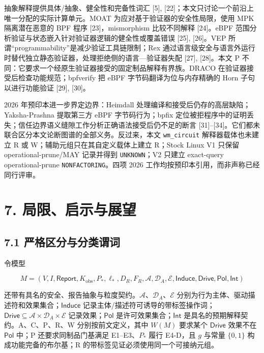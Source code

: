 \documentclass[
  11pt,
  a4paper,
]{ctexart}
\begin{document}
抽象解释提供具体/抽象、健全性和完备性词汇 {[}5{]},
{[}22{]}；本文只讨论一个前沿上唯一分配的实际计算单元。MOAT
为应对基于验证器的安全性局限，使用 MPK 隔离潜在恶意的 BPF 程序
{[}23{]}，mismorphism 比较不同解释 {[}24{]}。eBPF
范围分析验证与状态嵌入针对验证器逻辑的健全性或覆盖错误 {[}25{]},
{[}26{]}。VEP 所谓``programmability''是减少验证工具链限制；Rex
通过语言级安全与语言外运行时替代独立静态验证器，处理拒绝侧的语言---验证器失配
{[}27{]}, {[}28{]}。本文 P
不同：它要求一个经原生验证器接受的固定制品解释有界族。DRACO
在验证器接受后检查功能规范；bpfverify 把 eBPF 字节码翻译为位与内存精确的
Horn 子句以进行功能验证 {[}29{]}, {[}30{]}。

2026 年预印本进一步界定边界：Heimdall
处理编译和接受后仍存的高层缺陷；Yaksha-Prashna 提取第三方 eBPF
字节码行为；bpfix
定位被拒程序中的证明丢失；信任边界语义缝隙工作分析正确语法接受后仍不足的断言
{[}31{]}--{[}34{]}。它们都未联合区分本文论断图谱的全部义务。反过来，本文
\texttt{wm\_circuit} 解释器载体也未建立 R 或
W；辅助元组只在其自定义载体上建立 R；Stock Linux V1 只保留
operational-prune/MAY 记录并得到 \texttt{UNKNOWN}；V2 只建立 exact-query
operational-prune \texttt{NONFACTORING}。四项 2026
工作均按预印本引用，而非声称已经同行评审。

\hypertarget{7-ux5c40ux9650ux542fux793aux4e0eux5c55ux671b}{%
\section{7.
局限、启示与展望}\label{7-ux5c40ux9650ux542fux793aux4e0eux5c55ux671b}}

\hypertarget{71-ux4e25ux683cux533aux5206ux4e0eux5206ux7c7bux8c13ux8bcd}{%
\subsection{7.1
严格区分与分类谓词}\label{71-ux4e25ux683cux533aux5206ux4e0eux5206ux7c7bux8c13ux8bcd}}

令模型

\[M=(V,I,\mathsf{Report},K_{\mathrm{obs}},P_*,\ell_*,D_R,F_R,
\mathcal A,\mathcal D_A,\mathcal E,\mathsf{Induce},\mathsf{Drive},
\mathsf{Pol},\mathsf{Int})\]

还带有具名的安全、报告抽象与粒度契约。\(\mathcal A\)、\(\mathcal D_A\)、\(\mathcal E\)
分别为行为主体、驱动描述符和效果集合；\(\mathsf{Induce}\)
记录主体/描述符可诱导的带标签操作词；\(\mathsf{Drive}\subseteq\mathcal A\times\mathcal D_A\times\mathcal E\)
记录效果；\(\mathsf{Pol}\) 是许可效果集合；\(\mathsf{Int}\)
是具名的预期解释契约。A、C、P、R、W 分别按前文定义，其中 \(W(M)\)
要求某个 \(\mathsf{Drive}\) 效果不在 \(\mathsf{Pol}\) 中；P
还要求同制品门基满足 E1--E3、\(P_*\) 履行 E4-D，且 \(g\) 与常量
\(\{0,1\}\) 构成功能完备的布尔基；R
的带标签见证必须使用同一个可接纳元组。
\end{document}
